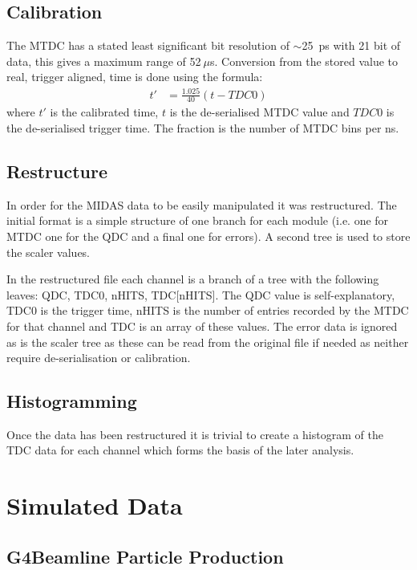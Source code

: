 \documentclass[]{article}
\newcommand{\ms}{$~\mu$s}
\begin{document}
\subsection{Calibration} %
\label{sub:calibration}
The MTDC has a stated least significant bit resolution of $\sim$25~ps with 21 bit of data, this gives a maximum range of 52\ms{}. Conversion from the stored value to real, trigger aligned, time is done using the formula:
\begin{align}\label{equ:tdc_calibration}
	t'   &= \frac{1.025}{40}(t - TDC0)
\end{align}
where $t'$ is the calibrated time, $t$ is the de-serialised MTDC value and $TDC0$ is the de-serialised trigger time. The fraction is the number of MTDC bins per ns.
\subsection{Restructure} %
\label{sub:restructure}
In order for the MIDAS data to be easily manipulated it was restructured. The initial format is a simple structure of one branch for each module (i.e. one for MTDC one for the QDC and a final one for errors). A second tree is used to store the scaler values. 

In the restructured file each channel is a branch of a tree with the following leaves: QDC, TDC0, nHITS, TDC[nHITS]. The QDC value is self-explanatory, TDC0 is the trigger time, nHITS is the number of entries recorded by the MTDC for that channel and TDC is an array of these values. The error data is ignored as is the scaler tree as these can be read from the original file if needed as neither require de-serialisation or calibration.
\subsection{Histogramming} %
\label{sub:Histogramming}
Once the data has been restructured it is trivial to create a histogram of the TDC data for each channel which forms the basis of the later analysis.
\section{Simulated Data} %
\label{sec:simulated_data}
\subsection{G4Beamline Particle Production} %
\label{sub:g4bl_particle_production}
\end{document}

